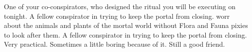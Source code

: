 \documentclass[char]{PP}
\begin{document}
\begin{itemz}[Notes]
	\item 
\end{itemz}

\begin{contacts}
	\contact{\cSLibrarian{}} One of your co-conspirators, who designed the ritual you will be executing on tonight.
	\contact{\cFHeart{}} A fellow conspirator in trying to keep the portal from closing. \cFHeart{\They} worr\cFHeart{\plualy} about the animals and plants of the mortal world without Flora and Fauna pixies to look after them.
	\contact{\cMIron{}} A fellow conspirator in trying to keep the portal from closing. Very practical. Sometimes a little boring because of it. Still a good friend.
\end{contacts}
\end{document}
